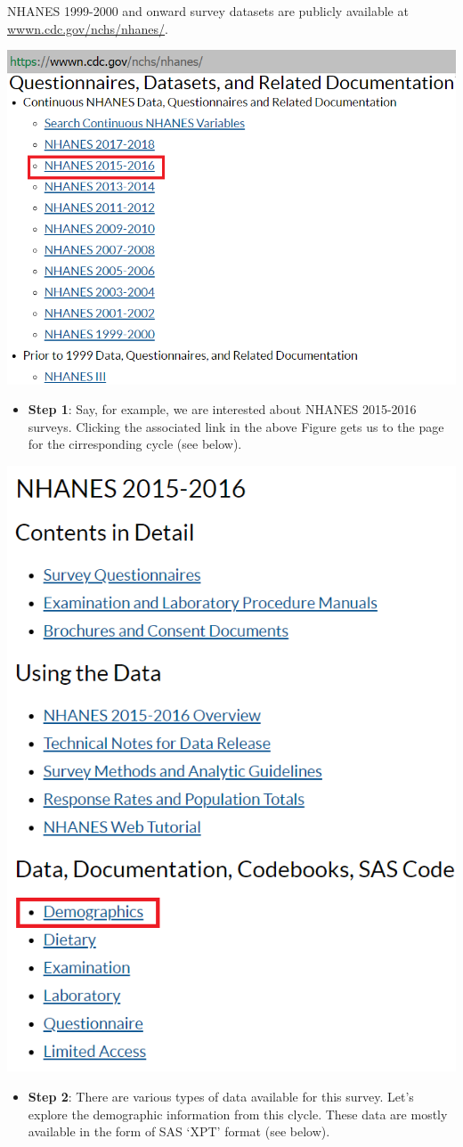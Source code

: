 \documentclass[
]{book}
\providecommand{\tightlist}{%
  \setlength{\itemsep}{0pt}\setlength{\parskip}{0pt}}
\begin{document}
NHANES 1999-2000 and onward survey datasets are publicly available at \href{https://wwwn.cdc.gov/nchs/nhanes/}{wwwn.cdc.gov/nchs/nhanes/}.

\includegraphics[width=0.65\linewidth]{images/n15}

\begin{itemize}
\tightlist
\item
  \textbf{Step 1}: Say, for example, we are interested about NHANES 2015-2016 surveys. Clicking the associated link in the above Figure gets us to the page for the cirresponding cycle (see below).
\end{itemize}

\includegraphics[width=0.65\linewidth]{images/n15demo}

\begin{itemize}
\tightlist
\item
  \textbf{Step 2}: There are various types of data available for this survey. Let's explore the demographic information from this clycle. These data are mostly available in the form of SAS `XPT' format (see below).
\end{itemize}
\end{document}
